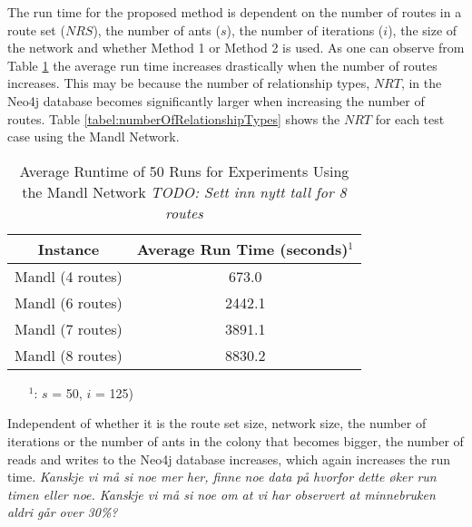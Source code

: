The run time for the proposed method is dependent on the number of routes in a route set ($NRS$), the number of ants ($s$), the number of iterations ($i$), the size of the network and whether Method 1 or Method 2 is used. As one can observe from Table \ref{tabel:runTimeMandl} the average run time increases drastically when the number of routes increases. This may be because the number of relationship types, $NRT$, in the Neo4j database becomes significantly larger when increasing the number of routes. Table \ref{tabel:numberOfRelationshipTypes} shows the $NRT$ for each test case using the Mandl Network.  

\begin{table}[H]
    \centering
    \hspace*{-1.0cm}
    \begin{tabular}{|c|c|}
        \hline
        \textbf{Instance} & \textbf{Average Run Time (seconds)$^1$}\\
        \hline
        Mandl (4 routes) & 673.0\\
        \hline
        Mandl (6 routes) & 2442.1\\
        \hline
        Mandl (7 routes) & 3891.1\\
        \hline
        Mandl (8 routes) & 8830.2\\
        \hline
    \end{tabular}
    \caption{Average Runtime of 50 Runs for Experiments Using the Mandl Network \emph{\color{blue} TODO: Sett inn nytt tall for 8 routes}}
    \begin{itemize}[noitemsep]
    \item[$^1$:] $s$ = 50, $i$ = 125)
    \end{itemize} 
    \label{tabel:runTimeMandl}
\end{table}

Independent of whether it is the route set size, network size, the number of iterations or the number of ants in the colony that becomes bigger, the number of reads and writes to the Neo4j database increases, which again increases the run time. \emph{\color{blue} Kanskje vi må si noe mer her, finne noe data på hvorfor dette øker run timen eller noe. Kanskje vi må si noe om at vi har observert at minnebruken aldri går over 30\%?}


